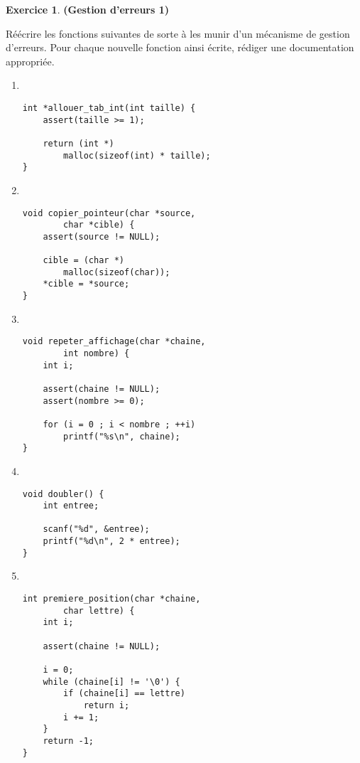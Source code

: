 \documentclass[12pt]{article}
\theoremstyle{definition}
\newtheorem{Exercice}{Exercice}
\begin{document}
\begin{Exercice} {\bf (Gestion d'erreurs 1)}\smallskip
    
Réécrire les fonctions suivantes de sorte à les munir d'un mécanisme 
de gestion d'erreurs. Pour chaque nouvelle fonction ainsi écrite, 
rédiger une documentation appropriée.
\begin{multicols}{2}
\begin{enumerate}
\item~
\begin{lstlisting}
int *allouer_tab_int(int taille) {
    assert(taille >= 1);

    return (int *) 
        malloc(sizeof(int) * taille);
}
\end{lstlisting}

\item~
\begin{lstlisting}
void copier_pointeur(char *source, 
        char *cible) {
    assert(source != NULL);
    
    cible = (char *) 
        malloc(sizeof(char));
    *cible = *source;
}
\end{lstlisting}


\item~
\begin{lstlisting}
void repeter_affichage(char *chaine, 
        int nombre) {
    int i;
    
    assert(chaine != NULL);
    assert(nombre >= 0);
    
    for (i = 0 ; i < nombre ; ++i) 
        printf("%s\n", chaine);
}
\end{lstlisting}

\item~
\begin{lstlisting}
void doubler() {
    int entree;
    
    scanf("%d", &entree);
    printf("%d\n", 2 * entree);
}
\end{lstlisting}
\bigskip
\bigskip
\bigskip

\item~
\begin{lstlisting}
int premiere_position(char *chaine, 
        char lettre) {
    int i;

    assert(chaine != NULL);
    
    i = 0;
    while (chaine[i] != '\0') {
        if (chaine[i] == lettre)
            return i;
        i += 1;
    }
    return -1;
}
\end{lstlisting}
\end{enumerate}
\end{multicols}
\end{Exercice}
\bigskip
\end{document}
